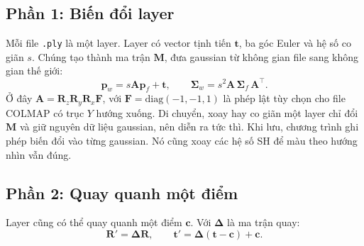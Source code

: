 \documentclass[9pt,twocolumn,a4paper]{extarticle}
\newcommand{\code}[1]{\texttt{#1}}
\newcommand{\Sig}{\symbf{\Sigma}}
\begin{document}
\subsection{Phần 1: Biến đổi layer}
\label{sec:layers}
Mỗi file \code{.ply} là một layer. Layer có vector tịnh tiến $\mathbf{t}$, ba góc Euler và hệ số co giãn $s$. Chúng tạo thành ma trận $\mathbf{M}$, đưa gaussian từ không gian file sang không gian thế giới:
\begin{equation}
\mathbf{p}_w=s\mathbf{A}\mathbf{p}_f+\mathbf{t},\qquad
\Sig_w=s^{2}\mathbf{A}\,\Sig_f\,\mathbf{A}^{\top}.
\label{eq:world}
\end{equation}
Ở đây $\mathbf{A}=\mathbf{R}_z\mathbf{R}_y\mathbf{R}_x\mathbf{F}$, với $\mathbf{F}=\mathrm{diag}(-1,-1,1)$ là phép lật tùy chọn cho file COLMAP có trục $Y$ hướng xuống. Di chuyển, xoay hay co giãn một layer chỉ đổi $\mathbf{M}$ và giữ nguyên dữ liệu gaussian, nên diễn ra tức thì. Khi lưu, chương trình ghi phép biến đổi vào từng gaussian. Nó cũng xoay các hệ số SH để màu theo hướng nhìn vẫn đúng.

\par\noindent{}\par\vspace{3pt}

\subsection{Phần 2: Quay quanh một điểm}
Layer cũng có thể quay quanh một điểm $\mathbf{c}$. Với $\symbf{\Delta}$ là ma trận quay:
\begin{equation}
\mathbf{R}'=\symbf{\Delta}\mathbf{R},\qquad \mathbf{t}'=\symbf{\Delta}(\mathbf{t}-\mathbf{c})+\mathbf{c}.
\end{equation}

\par\noindent{}\par\vspace{3pt}

\end{document}
